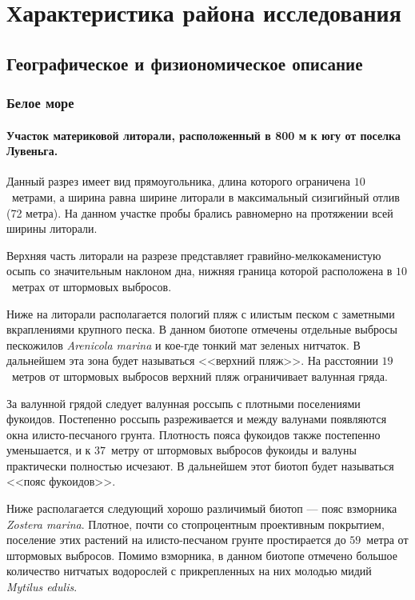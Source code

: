 
    \section{Характеристика района исследования}
        \subsection{Географическое и физиономическое описание}
			\subsubsection{Белое море}

\paragraph{Участок материковой литорали, расположенный в 800 м к югу от поселка Лувеньга.}

Данный разрез имеет вид прямоугольника, длина которого ограничена $10$~метрами, а ширина равна ширине литорали в максимальный сизигийный отлив (72 метра). 
На данном участке пробы брались равномерно на протяжении всей ширины литорали. 

Верхняя часть литорали на разрезе представляет гравийно-мелкокаменистую осыпь со значительным наклоном дна, нижняя граница которой расположена в 
$10$~метрах от штормовых выбросов.

Ниже на литорали располагается пологий пляж с илистым песком с заметными вкраплениями крупного песка. 
В данном биотопе отмечены отдельные выбросы пескожилов {\it Arenicola marina} и кое-где тонкий мат зеленых нитчаток. 
В дальнейшем эта зона будет называться <<верхний пляж>>. 
На расстоянии $19$~метров от штормовых выбросов верхний пляж ограничивает валунная гряда.

За валунной грядой следует валунная россыпь с плотными поселениями фукоидов. 
Постепенно россыпь разреживается и между валунами появляются окна илисто-песчаного грунта. 
Плотность пояса фукоидов также постепенно уменьшается, и к $37$~метру от штормовых выбросов фукоиды и валуны практически полностью исчезают. 
В дальнейшем этот биотоп будет называться <<пояс фукоидов>>.

Ниже располагается следующий хорошо различимый биотоп --- пояс взморника {\it Zostera marina}. 
Плотное, почти со стопроцентным проективным покрытием, поселение этих растений на илисто-песчаном грунте простирается до $59$~метра от штормовых выбросов. 
Помимо взморника, в данном биотопе отмечено большое количество нитчатых водорослей с прикрепленных на них молодью мидий {\it Mytilus edulis}.

